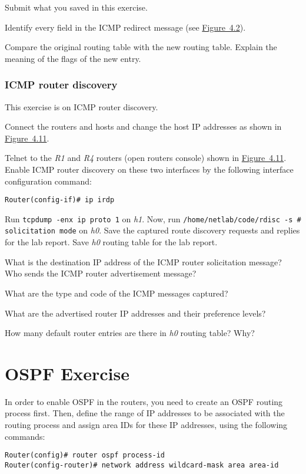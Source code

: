 \documentclass{../UTNetLab}
\begin{document}
    \begin{report}
        \item Submit what you saved in this exercise.
        
        \item Identify every field in the ICMP redirect message (see \hyperref[fig:4.2]{Figure~4.2}).
        
        \item Compare the original routing table with the new routing table.
    Explain the meaning of the flags of the new entry.
    \end{report}

\section{ICMP router discovery}\label{sec:ICMPRD}
    This exercise is on ICMP router discovery.
    
    Connect the routers and hosts and change the host IP addresses as shown in \hyperref[fig:4.11]{Figure~4.11}.
    
    Telnet to the \textit{R1} and \textit{R4} routers (open routers console) shown in \hyperref[fig:4.11]{Figure~4.11}.
    Enable ICMP router discovery on these two interfaces by the following interface configuration command:
    \begin{lstlisting}[language={cisco}]
Router(config-if)# ip irdp
    \end{lstlisting}
    Run \lstinline{tcpdump -enx ip proto 1} on \textit{h1}.
    Now, run \lstinline{/home/netlab/code/rdisc -s # solicitation mode} on \textit{h0}.
    Save the captured route discovery requests and replies for the lab report.
    Save \textit{h0} routing table for the lab report.
    
    \begin{report}
        \item What is the destination IP address of the ICMP router solicitation message? Who sends the ICMP router advertisement message?
        \item What are the type and code of the ICMP messages captured?
        \item What are the advertised router IP addresses and their preference levels?
        \item How many default router entries are there in \textit{h0} routing table? Why?
    \end{report}

\part{OSPF Exercise}\label{sec:ospf}
    In order to enable OSPF in the routers, you need to create an OSPF routing process first.
    Then, define the range of IP addresses to be associated with the routing process and assign area IDs for these IP addresses, using the following commands:
    \begin{lstlisting}[language={cisco}, emph={process-id, area-id, address, wildcard-mask}]
Router(config)# router ospf process-id
Router(config-router)# network address wildcard-mask area area-id
    \end{lstlisting}
    
\end{document}
